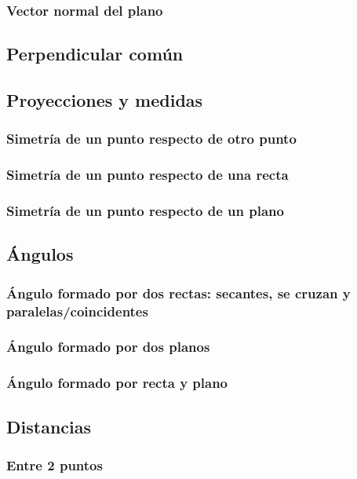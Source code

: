 \subsubsection{Vector normal del plano}
\subsection{Perpendicular común}

\subsection{Proyecciones y medidas}
\subsubsection{Simetría de un punto respecto de otro punto}
\subsubsection{Simetría de un punto respecto de una recta}
\subsubsection{Simetría de un punto respecto de un plano}

\newpage
\subsection{Ángulos}
\subsubsection{Ángulo formado por dos rectas: secantes, se cruzan y paralelas/coincidentes}
\subsubsection{Ángulo formado por dos planos}
\subsubsection{Ángulo formado por recta y plano}

\subsection{Distancias}
\subsubsection{Entre 2 puntos}
